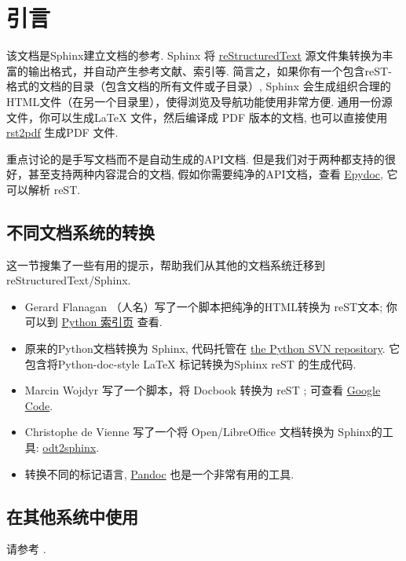 \documentclass[letterpaper,10pt,english]{sphinxmanual}
\begin{document}
\chapter{引言}
\label{intro::doc}\label{intro:id1}
该文档是Sphinx建立文档的参考.  Sphinx 将 \href{http://docutils.sf.net/rst.html}{reStructuredText}  源文件集转换为丰富的输出格式，并自动产生参考文献、索引等.
简言之，如果你有一个包含reST-格式的文档的目录（包含文档的所有文件或子目录）,
Sphinx 会生成组织合理的HTML文件（在另一个目录里），使得浏览及导航功能使用非常方便.
通用一份源文件，你可以生成LaTeX 文件，然后编译成 PDF 版本的文档,
也可以直接使用 \href{http://rst2pdf.googlecode.com}{rst2pdf} 生成PDF 文件.

重点讨论的是手写文档而不是自动生成的API文档.
但是我们对于两种都支持的很好，甚至支持两种内容混合的文档,
假如你需要纯净的API文档，查看 \href{http://epydoc.sf.net/}{Epydoc}, 它可以解析 reST.


\section{不同文档系统的转换}
\label{intro:id2}
这一节搜集了一些有用的提示，帮助我们从其他的文档系统迁移到reStructuredText/Sphinx.
\begin{itemize}
\item {} 
Gerard Flanagan （人名）写了一个脚本把纯净的HTML转换为 reST文本;
你可以到 \href{http://pypi.python.org/pypi/html2rest}{Python 索引页} 查看.

\item {} 
原来的Python文档转换为 Sphinx,
代码托管在 \href{http://svn.python.org/projects/doctools/converter}{the Python SVN repository}.
它包含将Python-doc-style LaTeX 标记转换为Sphinx reST 的生成代码.

\item {} 
Marcin Wojdyr 写了一个脚本，将 Docbook 转换为 reST ; 可查看 \href{http://code.google.com/p/db2rst/}{Google Code}.

\item {} 
Christophe de Vienne 写了一个将 Open/LibreOffice 文档转换为
Sphinx的工具: \href{http://pypi.python.org/pypi/odt2sphinx/}{odt2sphinx}.

\item {} 
转换不同的标记语言, \href{http://johnmacfarlane.net/pandoc/}{Pandoc} 也是一个非常有用的工具.

\end{itemize}


\section{在其他系统中使用}
\label{intro:id3}
请参考 {\hyperref[faq:usingwith]{}}.
\end{document}
